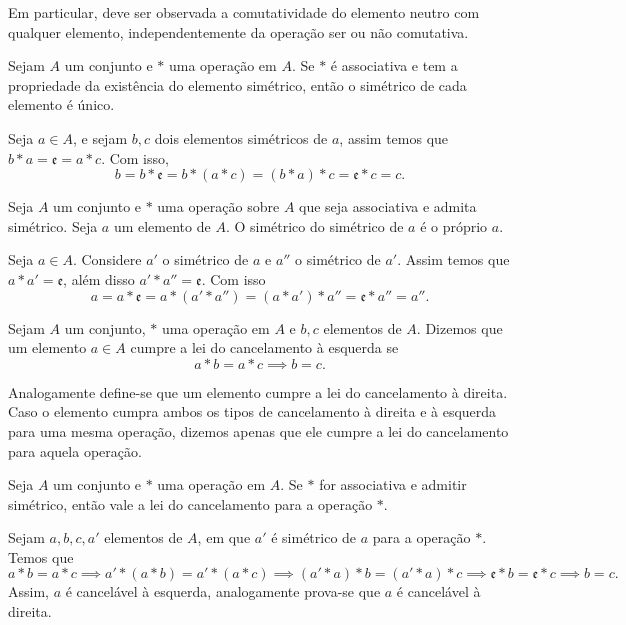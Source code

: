 \documentclass[../main.tex]{subfiles}
\begin{document}
Em particular, deve ser observada a comutatividade do elemento neutro com qualquer elemento, independentemente da operação ser ou não comutativa.

\begin{teo}\label{agb-teo-simetricoUnico}
    Sejam $A$ um conjunto e $*$ uma operação em $A$. Se $*$ é associativa e tem a propriedade da existência do elemento simétrico, então o simétrico de cada elemento é único.
\end{teo}
\begin{dem}
    Seja $a \in A$, e sejam $b, c$ dois elementos simétricos de $a$, assim temos que $b*a = \mathfrak{e} = a*c$. 
    Com isso, 
    \[ b = b * \mathfrak{e} = b * (a * c) = (b * a) * c = \mathfrak{e} * c = c. \]
\end{dem}

\begin{prop}\label{agb-prop-simetricoSimetrico}
    Seja $A$ um conjunto e $*$ uma operação sobre $A$ que seja associativa e admita simétrico. Seja $a$ um elemento de $A$. O simétrico do simétrico de $a$ é o próprio $a$. 
\end{prop}
\begin{dem}
    Seja $a \in A$. Considere $a'$ o simétrico de $a$ e $a''$ o simétrico de $a'$. Assim temos que $a * a' = \mathfrak{e}$, além disso $a' * a'' = \mathfrak{e}$.
    Com isso 
    \[ a = a * \mathfrak{e} = a * (a' * a'') = (a * a') * a'' = \mathfrak{e} * a'' = a''. \]
\end{dem}
\begin{defi}
    Sejam $A$ um conjunto, $*$ uma operação em $A$ e $b,c$ elementos de $A$. Dizemos que um elemento $a \in A$ cumpre a lei do cancelamento à esquerda se 
    \[ a*b=a*c \implies b=c. \]
\end{defi}
    Analogamente define-se que um elemento cumpre a lei do cancelamento à direita. Caso o elemento cumpra ambos os tipos de cancelamento à direita e à esquerda para uma mesma operação, dizemos apenas que ele cumpre a lei do cancelamento para aquela operação.
\begin{teo}\label{agb-teo-leiCancelamento}
    Seja $A$ um conjunto e $*$ uma operação em $A$. Se $*$ for associativa e admitir simétrico, então vale a lei do cancelamento para a operação $*$.
\end{teo}
\begin{dem}
    Sejam $a,b,c,a'$ elementos de $A$, em que $a'$ é simétrico de $a$ para a operação $*$. Temos que 
    \[a*b = a*c \implies a' * (a * b) = a' *(a*c) \implies (a' * a ) * b = (a'*a)*c \implies \mathfrak{e} * b = \mathfrak{e} * c \implies b = c. \] 
    Assim, $a$ é cancelável à esquerda, analogamente prova-se que $a$ é cancelável à direita.
\end{dem}
\end{document}
